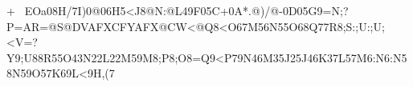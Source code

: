 +EOa08H/7I)0@06H5<J8@N:@L49F05C+0A*.@)/@-0D05G9=N;?P=AR=@S@DVAFXCFYAFX@CW<@Q8<O67M56N55O68Q77R8;S:;U:;U;<V=?Y9;U88R55O43N22L22M59M8;P8;O8=Q9<P79N46M35J25J46K37L57M6:N6:N58N59O57K69L<9H,(7%